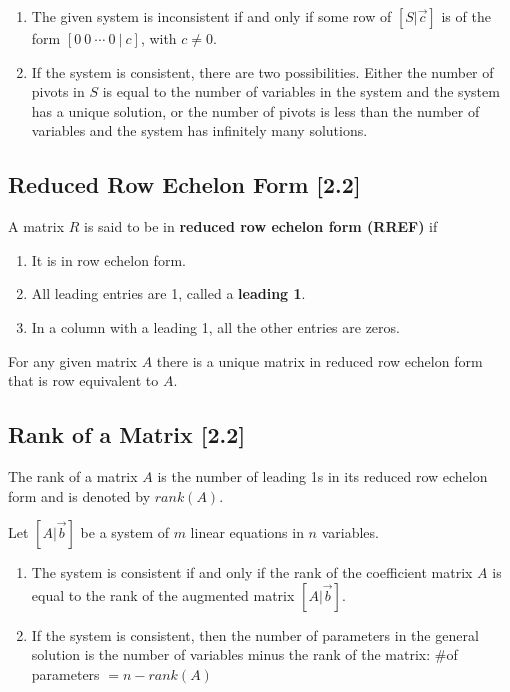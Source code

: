 \documentclass[a4paper,9pt]{extarticle}
\begin{document}
\begin{multicols*}{2}
\begin{enumerate}[label=\bfseries (\arabic*)] \itemsep0pt \parskip0pt 
    \item The given system is inconsistent if and only if some row of $[S | \vec{c}]$ is of the form $[0 \> 0 \> \cdots \> 0 \> | \> c]$, with $c \neq 0$.
    \item If the system is consistent, there are two possibilities. Either the number of pivots in $S$ is equal to the number of variables in the system and the system has a unique solution, or the number of pivots is less than the number of variables and the system has infinitely many solutions.
\end{enumerate}


\subsection{Reduced Row Echelon Form [2.2]}
A matrix $R$ is said to be in \textbf{reduced row echelon form (RREF)} if
\begin{enumerate}[label=\bfseries (\arabic*)] \itemsep0pt \parskip0pt 
    \item It is in row echelon form.
    \item All leading entries are 1, called a \textbf{leading 1}.
    \item In a column with a leading 1, all the other entries are zeros.
\end{enumerate}
For any given matrix $A$ there is a unique matrix in reduced row echelon form that is row equivalent to $A$.


\subsection{Rank of a Matrix [2.2]}
The rank of a matrix $A$ is the number of leading 1s in its reduced row echelon form and is denoted by $rank(A)$.

Let $[A | \vec{b}]$ be a system of $m$ linear equations in $n$ variables.
\begin{enumerate}[label=\bfseries (\arabic*)] \itemsep0pt \parskip0pt 
    \item The system is consistent if and only if the rank of the coefficient matrix $A$ is
equal to the rank of the augmented matrix $[A | \vec{b}]$.
    \item If the system is consistent, then the number of parameters in the general solution is the number of variables minus the rank of the matrix: \#of parameters $= n - rank(A)$
\end{enumerate}


\end{multicols*}
\end{document}
